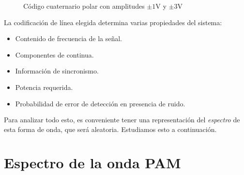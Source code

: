 \begin{figure}
    \begin{center}
        \caption{Código cuaternario polar con amplitudes $\pm 1\unit{\volt}$ y $\pm 3\unit{\volt}$}\label{fig:linea m-ario}
    \end{center}
\end{figure}

La codificación de línea elegida determina varias propiedades del sistema:
\begin{itemize}
    \item Contenido de frecuencia de la señal.
    \item Componentes de continua.
    \item Información de sincronismo.
    \item Potencia requerida.
    \item Probabilidad de error de detección en presencia de ruido.
\end{itemize}

Para analizar todo esto, es conveniente tener una representación del \emph{espectro} de esta forma de onda, que será aleatoria. Estudiamos esto a continuación.

\section{Espectro de la onda PAM}

